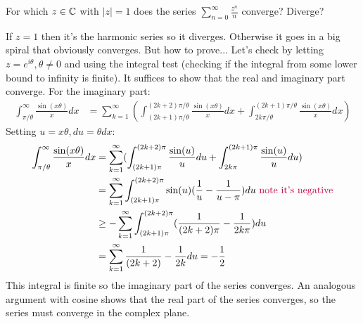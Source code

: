 \documentclass{homework}
\begin{document}
                                    \begin{problem}
                                      For which $z \in \mathbb{C}$ with $|z|=1$ does the series
                                        $\displaystyle\sum_{n=0}^{\infty} \frac{z^n}{n}$ converge?  Diverge?
                                        \end{problem}
                                        \begin{solution}
                                        If $z=1$ then it's the harmonic series so it diverges. Otherwise it goes in a big spiral that obviously converges. But how to prove... Let's check by letting $z=e^{i\theta}, \theta\neq 0$ and using the integral test (checking if the integral from some lower bound to infinity is finite). It suffices to show that the real and imaginary part converge. For the imaginary part:
                                        \begin{align*}
                                        \int_{\pi/\theta}^\infty \frac{\sin(x\theta)}{x} dx &=
                                        \sum_{k=1}^\infty (\int_{(2k + 1)\pi /\theta}^{(2k+2)\pi/\theta} \frac{\sin(x\theta)}{x} dx +
                                        \int_{2k\pi/\theta}^{(2k + 1)\pi/\theta} \frac{\sin(x\theta)}{x} dx)
                                        \end{align*}
                                        Setting $u=x\theta, du = \theta dx$:
                                        \begin{align*}
                                        \int_{\pi/\theta}^\infty \frac{\sin(x\theta)}{x} dx &= \sum_{k=1}^\infty (\int_{(2k + 1)\pi}^{(2k+2)\pi} \frac{\sin(u)}{u} du +
                                        \int_{2k\pi}^{(2k + 1)\pi} \frac{\sin(u)}{u} du)\\
                                        &= \sum_{k=1}^\infty \int_{(2k + 1)\pi}^{(2k+2)\pi} \sin(u)(\frac{1}{u} - \frac{1}{u-\pi}) du  \color{purple} \text{ note it's negative}\\
                                        &\geq -\sum_{k=1}^\infty \int_{(2k + 1)\pi}^{(2k+2)\pi} (\frac{1}{(2k+2)\pi} - \frac{1}{2k\pi}) du \\
                                        &= \sum_{k=1}^\infty \frac{1}{(2k+2)} - \frac{1}{2k} du = -\frac{1}{2}
                                        \end{align*}
                                        This integral is finite so the imaginary part of the series converges. An analogous argument with cosine shows that the real part of the series converges, so the series must converge in the complex plane.
                                        \end{solution}
\end{document}
